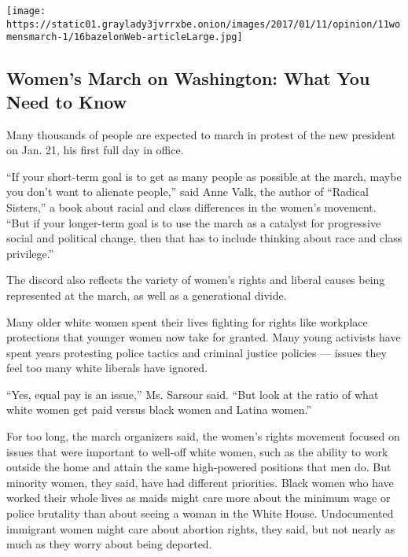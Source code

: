 \href{https://www.nytimes3xbfgragh.onion/interactive/2017/01/10/us/politics/womens-march-guide.html}{}

\texttt{[image: https://static01.graylady3jvrrxbe.onion/images/2017/01/11/opinion/11womensmarch-1/16bazelonWeb-articleLarge.jpg]}

\hypertarget{womens-march-on-washington-what-you-need-to-know}{%
\subsection{Women's March on Washington: What You Need to
Know}\label{womens-march-on-washington-what-you-need-to-know}}

Many thousands of people are expected to march in protest of the new
president on Jan. 21, his first full day in office.

``If your short-term goal is to get as many people as possible at the
march, maybe you don't want to alienate people,'' said Anne Valk, the
author of ``Radical Sisters,'' a book about racial and class differences
in the women's movement. ``But if your longer-term goal is to use the
march as a catalyst for progressive social and political change, then
that has to include thinking about race and class privilege.''

The discord also reflects the variety of women's rights and liberal
causes being represented at the march, as well as a generational divide.

Many older white women spent their lives fighting for rights like
workplace protections that younger women now take for granted. Many
young activists have spent years protesting police tactics and criminal
justice policies --- issues they feel too many white liberals have
ignored.

``Yes, equal pay is an issue,'' Ms. Sarsour said. ``But look at the
ratio of what white women get paid versus black women and Latina
women.''

For too long, the march organizers said, the women's rights movement
focused on issues that were important to well-off white women, such as
the ability to work outside the home and attain the same high-powered
positions that men do. But minority women, they said, have had different
priorities. Black women who have worked their whole lives as maids might
care more about the minimum wage or police brutality than about seeing a
woman in the White House. Undocumented immigrant women might care about
abortion rights, they said, but not nearly as much as they worry about
being deported.


